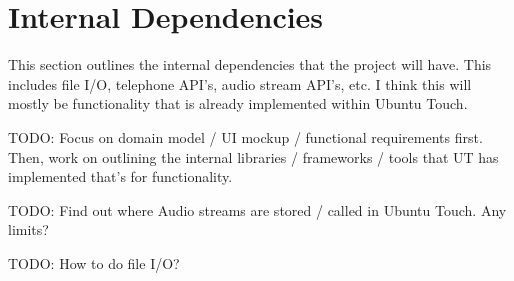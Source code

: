 \section{Internal Dependencies}

This section outlines the internal dependencies that the project will have. This includes file I/O, telephone API's, audio stream API's, etc. I think this will mostly be functionality that is already implemented within Ubuntu Touch.


TODO: Focus on domain model / UI mockup / functional requirements first. Then, work on outlining the internal libraries / frameworks / tools that UT has implemented that's for functionality.

TODO: Find out where Audio streams are stored / called in Ubuntu Touch. Any limits?

TODO: How to do file I/O?

